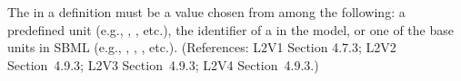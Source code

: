 The  in a \Parameter definition must be a value chosen from
among the following: a predefined unit (e.g., , ,
etc.), the identifier of a \UnitDefinition in the model, or one of the
base units in SBML (e.g., , , ,
etc.).  (References: L2V1 Section 4.7.3; L2V2 Section~4.9.3; L2V3
Section~4.9.3; L2V4 Section~4.9.3.)

